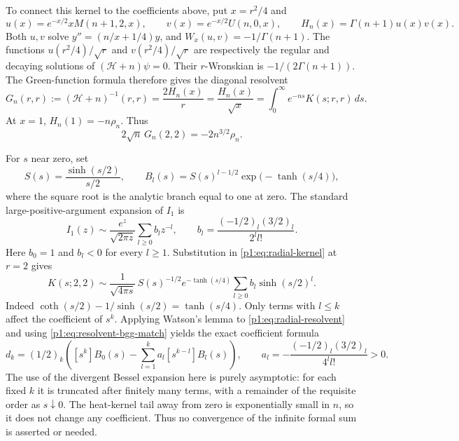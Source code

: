 \documentclass[11pt,a4paper]{article}
\theoremstyle{definition}
\theoremstyle{remark}
\numberwithin{equation}{section}
\begin{document}
To connect this kernel to the coefficients above, put $x=r^2/4$ and
\[
 u(x)=e^{-x/2}xM(n+1,2,x),\qquad
 v(x)=e^{-x/2}U(n,0,x),\qquad
 H_n(x)=\Gamma(n+1)u(x)v(x).
\]
Both $u,v$ solve $y''=(n/x+1/4)y$, and
$W_x(u,v)=-1/\Gamma(n+1)$. The functions
$u(r^2/4)/\sqrt r$ and $v(r^2/4)/\sqrt r$ are respectively the
regular and decaying solutions of $(\mathscr H+n)\psi=0$.
Their $r$-Wronskian is $-1/(2\Gamma(n+1))$.
The Green-function formula therefore gives the diagonal resolvent
\begin{equation}\label{p1:eq:radial-resolvent}
 G_n(r,r):=(\mathscr H+n)^{-1}(r,r)
 =\frac{2H_n(x)}r
 =\frac{H_n(x)}{\sqrt x}
 =\int_0^\infty e^{-ns}K(s;r,r)\,ds.
\end{equation}
At $x=1$, $H_n(1)=-n\rho_n$. Thus
\begin{equation}\label{p1:eq:resolvent-bgg-match}
 2\sqrt n\,G_n(2,2)=-2n^{3/2}\rho_n.
\end{equation}

For $s$ near zero, set
\[
 S(s)=\frac{\sinh(s/2)}{s/2},\qquad
 B_l(s)=S(s)^{l-1/2}\exp\bigl(-\tanh(s/4)\bigr),
\]
where the square root is the analytic branch equal to one at zero.
The standard large-positive-argument expansion of $I_1$ \cite[10.40.1]{p1:DLMF} is
\[
 I_1(z)\sim\frac{e^z}{\sqrt{2\pi z}}
       \sum_{l\geq0}b_lz^{-l},\qquad
 b_l=\frac{(-1/2)_l(3/2)_l}{2^l l!}.
\]
Here $b_0=1$ and $b_l<0$ for every $l\geq1$.
Substitution in \eqref{p1:eq:radial-kernel} at $r=2$ gives
\begin{equation}\label{p1:eq:kernel-formal}
 K(s;2,2)\sim\frac1{\sqrt{4\pi s}}\,
 S(s)^{-1/2}e^{-\tanh(s/4)}
       \sum_{l\geq0}b_l\sinh(s/2)^l.
\end{equation}
Indeed $\coth(s/2)-1/\sinh(s/2)=\tanh(s/4)$.
Only terms with $l\leq k$ affect the coefficient of $s^k$.
Applying Watson's lemma to \eqref{p1:eq:radial-resolvent} and using
\eqref{p1:eq:resolvent-bgg-match} yields the exact coefficient formula
\begin{equation}\label{p1:eq:sign-coefficients}
 d_k=(1/2)_k\left(
 [s^k]B_0(s)-\sum_{l=1}^k a_l[s^{k-l}]B_l(s)\right),
 \qquad
 a_l=-\frac{(-1/2)_l(3/2)_l}{4^l l!}>0.
\end{equation}
The use of the divergent Bessel expansion here is purely asymptotic:
for each fixed $k$ it is truncated after finitely many terms, with a
remainder of the requisite order as $s\downarrow0$. The heat-kernel
tail away from zero is exponentially small in $n$, so it does not
change any coefficient. Thus no convergence of the infinite formal
sum is asserted or needed.
\end{document}
